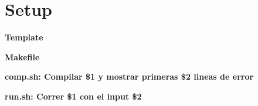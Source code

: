 \section{Setup}
    \textbf{Template}
    
    
    \textbf{Makefile}
    
    
    \textbf{comp.sh: Compilar \$1 y mostrar primeras \$2 lineas de error}
    
    
    \textbf{run.sh: Correr \$1 con el input \$2}
    